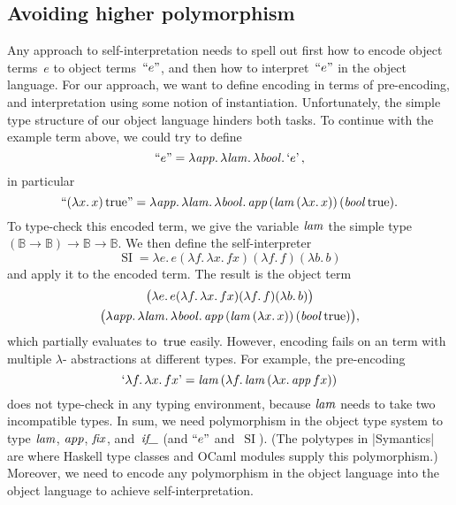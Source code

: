 \documentclass[preprint]{sigplanconf}
\newcommand{\BB}{\mathbb{B}}
\newcommand{\fun}[1]{\mathopen{\lambda\mathord{#1}.\,}}
\newcommand{\True}{\mathinner{\mathrm{true}}}
\newcommand{\Encode}[1]{\mathinner{\mathopen{\text{``}}#1\mathclose{\text{''}}}}
\newcommand{\encode}[1]{\mathinner{\mathopen{\text{`}}#1\mathclose{\text{'}}}}
\newcommand{\ident}[1]{\mathinner{\text{\textit{#1\/}}}}
\DeclareMathOperator{\si}{SI}
\begin{document}
\subsection{Avoiding higher polymorphism}

Any approach to self\hyp interpretation needs to spell out first how to
encode object terms~$e$ to object terms~$\Encode{e}$, and then how to
interpret~$\Encode{e}$ in the object language.  For our approach, we
want to define encoding in terms of pre-encoding, and interpretation
using some notion of instantiation.  Unfortunately, the simple type
structure of our object language hinders both tasks.  To continue with
the example term above, we could try to define
\begin{equation*}
    \Encode{e} =
    \fun{\ident{app}} \fun{\ident{lam}} \fun{\ident{bool}} \encode{e},
\end{equation*}
in particular
\begin{equation*}
    \Encode{(\fun{x}x)\True} =
    \fun{\ident{app}} \fun{\ident{lam}} \fun{\ident{bool}}
    \ident{app} (\ident{lam} (\fun{x} x))\, (\ident{bool} \True).
\end{equation*}
To type-check this encoded term, we give the variable $\ident{lam}$ the
simple type $(\BB\to\BB)\to\BB\to\BB$.
We then define the self\hyp interpreter
\begin{equation*}
    \si = \fun{e} e
    (\fun{f} \fun{x} fx)
    (\fun{f} f)
    (\fun{b} b)
\end{equation*}
and apply it to the encoded term.  The result is the object term
\begin{multline*}
    \bigl(\fun{e} e (\fun{f} \fun{x} fx) (\fun{f} f) (\fun{b} b)\bigr)
\\
    \bigl(
    \fun{\ident{app}} \fun{\ident{lam}} \fun{\ident{bool}}
    \ident{app} (\ident{lam} (\fun{x} x))\, (\ident{bool} \True)
    \bigr),
\end{multline*}
which partially evaluates to~$\True$ easily.
However, encoding fails on an term with multiple $\lambda$\hyp
abstractions at different types.  For example, the pre-encoding
\begin{equation*}
    \encode{\fun{f}\fun{x}fx}
    = \ident{lam} (\fun{f} \ident{lam} (\fun{x} \ident{app} f x))
\end{equation*}
does not type-check in any typing environment, because $\ident{lam}$ needs
to take two incompatible types.  In sum, we need polymorphism in the
object type system to type $\ident{lam}$, $\ident{app}$, $\ident{fix}$,
and~$\ident{if\_}$ (and $\Encode{e}$ and~$\si$).
(The polytypes in |Symantics| are where Haskell type classes and OCaml
modules supply this polymorphism.)  Moreover, we need to encode any
polymorphism in the object language into the object language to achieve
self\hyp interpretation.
\end{document}
